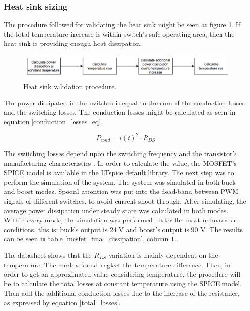 \subsubsection{Heat sink sizing}

The procedure followed for validating the heat sink might be seen at figure \ref{heat_sink_validation_procedure}. If the total temperature increase is within switch's safe operating area, then the heat sink is providing enough heat dissipation.

\begin{figure}[htbp]
	\begin{center}
		\includegraphics[width=\textwidth]{../Pictures/P1/Component_sizing/heat_sink_validation_procedure.png}
		\caption{Heat sink validation procedure.}
		\label{heat_sink_validation_procedure}
	\end{center}	
\end{figure}

The power dissipated in the switches is equal to the sum of the conduction losses and the switching losses. The conduction losses might be calculated  as seen in equation \ref{conduction_losses_eq}.

\begin{equation} \label{conduction_losses_eq}
P_{cond} = i(t)^2 \cdot R_{DS}
\end{equation}

The switching losses depend upon the switching frequency and the transistor's manufacturing characteristics \cite{mosfet_losses}. In order to calculate the value, the MOSFET's SPICE model is available in the LTspice default library. The next step was to perform the simulation of the system. The system was simulated in both buck and boost modes. Special attention was put into the dead-band between PWM signals of different switches, to avoid current shoot through. After simulating, the average power dissipation under steady state was calculated in both modes. Within every mode, the simulation was performed under the most unfavorable conditions, this is: buck's output is 24 V and boost's output is 90 V. The results can be seen in table \ref{mosfet_final_dissipation}, column 1.

The datasheet shows that the $R_{DS}$ variation is mainly dependent on the temperature\cite{mosfet_datasheet}. The models found neglect the temperature difference. 
Then, in order to get an approximated value considering temperature, the procedure will be to calculate the total losses at constant temperature using the SPICE model. 
Then add the additional conduction losses due to the increase of the resistance, as expressed by equation \ref{total_losses}.

